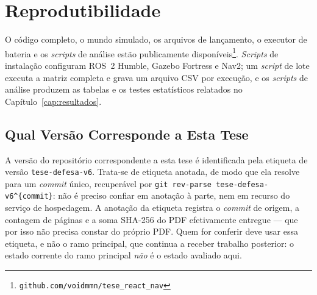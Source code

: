 \section{Reprodutibilidade}
\label{sec:setup-repro}

O código completo, o mundo simulado, os arquivos de lançamento, o executor de
bateria e os \textit{scripts} de análise estão publicamente
disponíveis\footnote{\texttt{github.com/voidmmn/tese\_react\_nav}}. \textit{Scripts}
de instalação configuram ROS~2 Humble, Gazebo Fortress e Nav2; um \textit{script} de
lote executa a matriz completa e grava um arquivo CSV por execução, e os
\textit{scripts} de análise produzem as tabelas e os testes estatísticos relatados no
Capítulo~\ref{cap:resultados}.

\subsection{Qual Versão Corresponde a Esta Tese}

A versão do repositório correspondente a esta tese é identificada pela etiqueta de
versão \texttt{tese-defesa-v6}. Trata-se de etiqueta anotada, de modo que ela resolve
para um \textit{commit} único, recuperável por
\texttt{git rev-parse tese-defesa-v6\textasciicircum\{commit\}}: não é preciso confiar em
anotação à parte, nem em recurso do serviço de hospedagem. A anotação da etiqueta
registra o \textit{commit} de origem, a contagem de páginas e a soma SHA-256 do PDF
efetivamente entregue --- que por isso não precisa constar do próprio PDF. Quem for
conferir deve usar essa etiqueta, e não o ramo principal, que continua a receber
trabalho posterior: o estado corrente do ramo principal \emph{não} é o estado avaliado
aqui.


